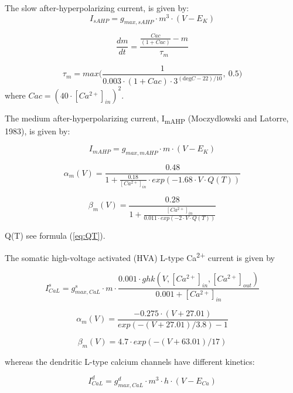 \documentclass[a4paper,12pt]{article}
\begin{document}
The slow after-hyperpolarizing current, is given by:
\begin{equation}
I_{sAHP}= g_{max, sAHP} \cdot m^3 \cdot (V-E_K)
\end{equation}

\begin{equation}
\frac{dm}{dt}=\frac{\frac{Cac}{(1+Cac)}-m}{\tau_m}
\end{equation}

\begin{equation}
\tau_m=max \Big(\frac {1}{0.003 \cdot (1+Cac)\cdot 3^{(\text{deg}C-22)/10}}, \ 0.5 \Big)
\end{equation}
where 
$Cac=(40 \cdot [Ca^{2+}]_{in})^2$.

The medium after-hyperpolarizing current, I\textsubscript{mAHP} (Moczydlowski and Latorre, 1983), is given by:

\begin{equation}
I_{mAHP}= g_{max, mAHP}\cdot m\cdot (V-E_K)
\end{equation}

\begin{equation}
\alpha_m(V)=\frac{0.48}{1+\frac{0.18}{[Ca^{2+}]_{in}}\cdot exp(-1.68\cdot V\cdot Q(T))}
\end{equation}

\begin{equation}
\beta_m(V)=\frac{0.28}{1+\frac{[Ca^{2+}]_{in}}{0.011\cdot exp(-2\cdot V\cdot Q(T))}}
\end{equation}

Q(T) see formula (\ref{eq:QT}). \par
The somatic high-voltage activated (HVA) L-type Ca\textsuperscript{2+} current is given by


\begin{equation}
I_{CaL}^s= g_{max, CaL}^s\cdot m\cdot \frac{0.001 \cdot ghk(V, [Ca^{2+}]_{in}, [Ca^{2+}]_{out}) }{0.001 + [Ca^{2+}]_{in}}
\end{equation}

\begin{equation}
\alpha_m(V)= \frac{-0.275 \cdot (V+27.01)}{exp(-(V+27.01)/3.8)-1}
\end{equation}

\begin{equation}
 \beta_m(V)= 4.7 \cdot exp(-(V+63.01)/17)
\end{equation}


whereas the dendritic L-type calcium channels have different kinetics: 


\begin{equation}
I_{CaL}^d= g_{max, CaL}^d \cdot m^3 \cdot h \cdot
(V-E_{Ca})
\end{equation}
\end{document}
